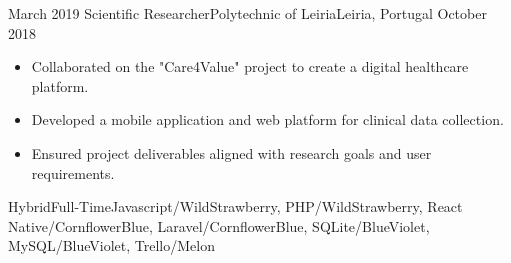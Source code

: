 \begin{experiences}
  \emptySeparator

  \experience
  {March 2019} {Scientific Researcher}{Polytechnic of Leiria}{Leiria, Portugal}
  {October 2018}{\begin{itemize}
    \item Collaborated on the "Care4Value" project to create a digital healthcare platform.
    \item Developed a mobile application and web platform for clinical data collection.
    \item Ensured project deliverables aligned with research goals and user requirements.
  \end{itemize}}
  {Hybrid}{Full-Time}{Javascript/WildStrawberry, PHP/WildStrawberry, React Native/CornflowerBlue, Laravel/CornflowerBlue, SQLite/BlueViolet, MySQL/BlueViolet, Trello/Melon}

\end{experiences}